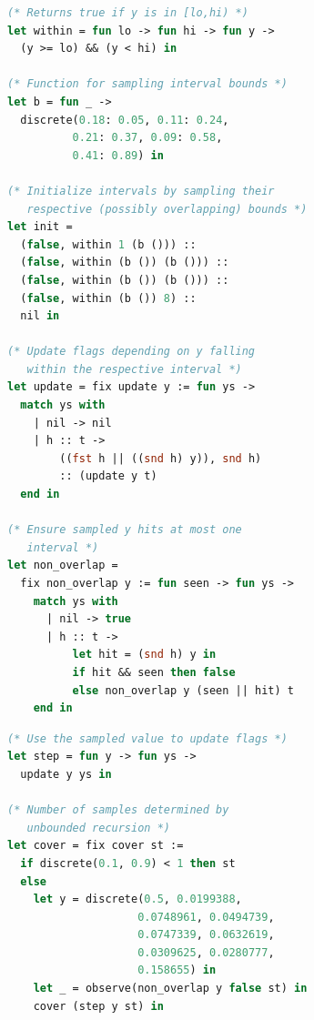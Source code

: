 \begin{figure}[t]
    \centering
    \begin{minipage}[t]{0.46\textwidth}
    \vspace{0pt}
    \begin{lstlisting}[aboveskip=0.4em,belowskip=0.4em,
      language=OCaml,
      escapechar=!,
      numbers=right,
      stepnumber=1,
      numberstyle=\color{gray}\scriptsize,
      numbersep=7pt,
      basicstyle=\ttfamily\footnotesize,
      commentstyle=\color{ForestGreen}\itshape]
(* Returns true if y is in [lo,hi) *)
let within = fun lo -> fun hi -> fun y ->
  (y >= lo) && (y < hi) in 

(* Function for sampling interval bounds *)
let b = fun _ ->
  discrete(0.18: 0.05, 0.11: 0.24,
          0.21: 0.37, 0.09: 0.58,
          0.41: 0.89) in

(* Initialize intervals by sampling their
   respective (possibly overlapping) bounds *)
let init =
  (false, within 1 (b ())) ::
  (false, within (b ()) (b ())) ::
  (false, within (b ()) (b ())) ::
  (false, within (b ()) 8) ::
  nil in 

(* Update flags depending on y falling 
   within the respective interval *)
let update = fix update y := fun ys ->
  match ys with
    | nil -> nil
    | h :: t ->
        ((fst h || ((snd h) y)), snd h)
        :: (update y t)
  end in

(* Ensure sampled y hits at most one 
   interval *)
let non_overlap = 
  fix non_overlap y := fun seen -> fun ys ->
    match ys with
      | nil -> true
      | h :: t ->
          let hit = (snd h) y in
          if hit && seen then false
          else non_overlap y (seen || hit) t
    end in
    \end{lstlisting}
    \end{minipage}
    \hfill
    \hspace{-4pt}%
    \begin{minipage}[t]{0.46\textwidth}
    \vspace{0pt}
    \begin{lstlisting}[aboveskip=0.4em,belowskip=0.4em,
      language=OCaml,
      escapechar=! ,
      numbers=right,
      stepnumber=1,
      firstnumber=last,
      numberstyle=\color{gray}\scriptsize,
      numbersep=7pt,
      basicstyle=\ttfamily\footnotesize,
      commentstyle=\color{ForestGreen}\itshape]
(* Use the sampled value to update flags *)
let step = fun y -> fun ys ->
  update y ys in

(* Number of samples determined by
   unbounded recursion *)
let cover = fix cover st :=
  if discrete(0.1, 0.9) < 1 then st
  else
    let y = discrete(0.5, 0.0199388, 
                    0.0748961, 0.0494739, 
                    0.0747339, 0.0632619, 
                    0.0309625, 0.0280777, 
                    0.158655) in
    let _ = observe(non_overlap y false st) in
    cover (step y st) in


\end{lstlisting}
\end{minipage}
\end{figure}
